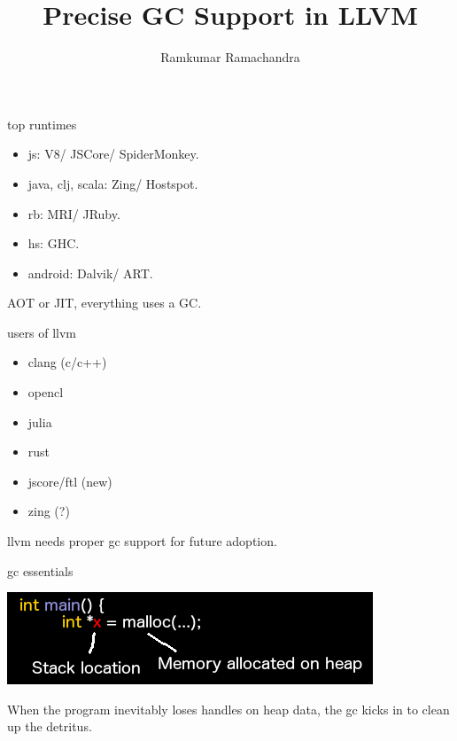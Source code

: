 \documentclass{beamer}
\title{Precise GC Support in LLVM}
\author{Ramkumar Ramachandra}
\begin{document}
\begin{frame}
  \titlepage
\end{frame}

\begin{frame}{top runtimes}
  \begin{itemize}
  \item[] js: V8/ JSCore/ SpiderMonkey.
  \item[] java, clj, scala: Zing/ Hostspot.
  \item[] rb: MRI/ JRuby.
  \item[] hs: GHC.
  \item[] android: Dalvik/ ART.
  \end{itemize}
  \vfill
  AOT or JIT, everything uses a GC.
\end{frame}

\begin{frame}{users of llvm}
  \begin{itemize}
  \item[] clang (c/c++)
  \item[] opencl
  \item[] julia
  \item[] rust
  \item[] jscore/ftl (new)
  \item[] zing (?)
  \end{itemize}
  \vfill
  llvm needs proper gc support for future adoption.
\end{frame}

\begin{frame}{gc essentials}
  \begin{center}\includegraphics[scale=0.6]{memory-stack-heap}\end{center}
  \vfill
  When the program inevitably loses handles on heap data, the gc kicks
  in to clean up the detritus.
\end{frame}
\end{document}
